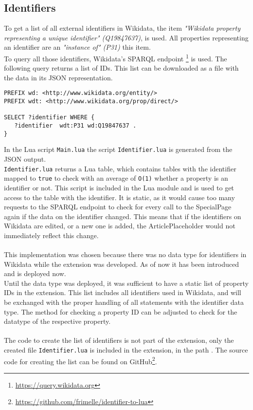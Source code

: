 \subsection{Identifiers}

To get a list of all external identifiers in Wikidata, the item \textit{"Wikidata property representing a unique identifier" (Q19847637)}, is used. All properties representing an identifier are an \textit{"instance of" (P31)} this item. \\
To query all those identifiers, Wikidata's SPARQL endpoint \footnote{\href{https://query.wikidata.org}{https://query.wikidata.org}} is used. The following query returns a list of IDs. This list can be downloaded as a file with the data in its JSON representation. \\

\begin{lstlisting}[frame=single] 
PREFIX wd: <http://www.wikidata.org/entity/>
PREFIX wdt: <http://www.wikidata.org/prop/direct/>

SELECT ?identifier WHERE {
   ?identifier  wdt:P31 wd:Q19847637 . 
}
\end{lstlisting}

In the Lua script \texttt{\justify Main.lua} the script \texttt{\justify Identifier.lua} is generated from the JSON output. \\  \texttt{\justify Identifier.lua} returns a Lua table, which contains tables with the identifier mapped to \texttt{true} to check with an average of \texttt{\justify O(1)} whether a property is an identifier or not. This script is included in the Lua module and is used to get access to the table with the identifier. It is static, as it would cause too many requests to the SPARQL endpoint to check for every call to the SpecialPage again if the data on the identifier changed. This means that if the identifiers on Wikidata are edited, or a new one is added, the ArticlePlaceholder would not immediately reflect this change. \\
\\
This implementation was chosen because there was no data type for identifiers in Wikidata while the extension was developed. As of now it has been introduced and is deployed now. \\
Until the data type was deployed, it was sufficient to have a static list of property IDs in the extension. This list includes all identifiers used in Wikidata, and will be exchanged with the proper handling of all statements with the identifier data type. The method for checking a property ID can be adjusted to check for the datatype of the respective property. \\
\\
The code to create the list of identifiers is not part of the extension, only the created file \texttt{\justify Identifier.lua} is included in the extension, in the path . The source code for creating the list can be found on GitHub\footnote{\url{https://github.com/frimelle/identifier-to-lua}}. 
